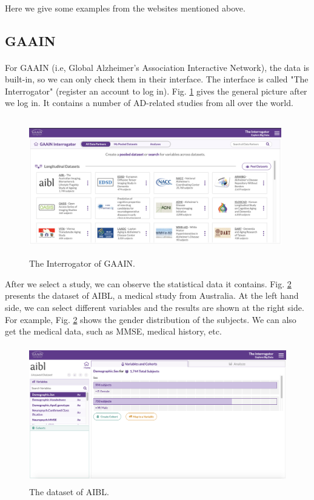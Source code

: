 \documentclass{article}
\begin{document}
\paragraph{}
Here we give some examples from the websites mentioned above. 

\subsection{GAAIN}
\paragraph{}
For GAAIN (i.e, Global Alzheimer’s Association Interactive Network), the data is built-in, so we can only check them in their interface. The interface is called "The Interrogator" (register an account to log in). Fig. \ref{f:gaain} gives the general picture after we log in. It contains a number of AD-related studies from all over the world. 

\begin{figure}[!hbt]
\centering
\includegraphics[width=11cm, height=6cm]{figs/gaain.png}
\caption{The Interrogator of GAAIN.}
\label{f:gaain}
\end{figure}

After we select a study, we can observe the statistical data it contains. Fig. \ref{f:aibl} presents the dataset of AIBL, a medical study from Australia. At the left hand side, we can select different variables and the results are shown at the right side. For example, Fig. \ref{f:aibl} shows the gender distribution of the subjects. We can also get the medical data, such as MMSE, medical history, etc.

\begin{figure}[!hbt]
\centering
\includegraphics[width=12cm, height=6cm]{figs/aibl.png}
\caption{The dataset of AIBL.}
\label{f:aibl}
\end{figure}
\end{document}
